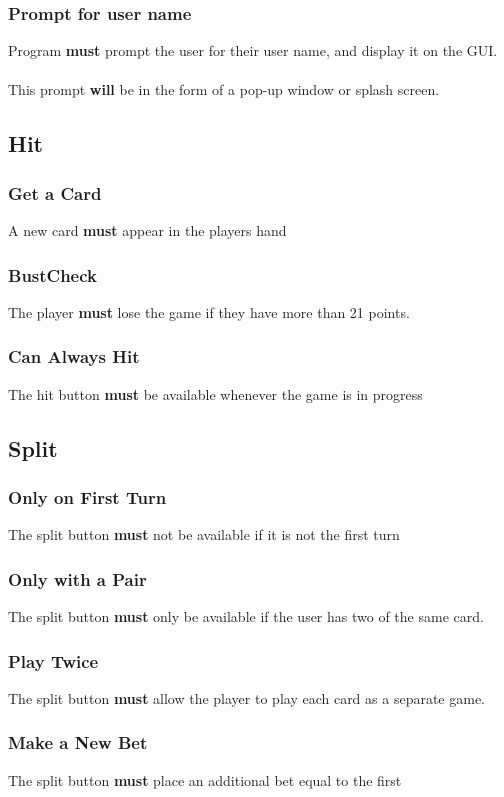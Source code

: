 \documentclass{article}
\begin{document}
\subsubsection{Prompt for user name}Program \textbf{must} prompt the user for their user name, and display it on the GUI.  
\paragraph{}This prompt \textbf{will} be in the form of a pop-up window or splash screen.
\subsection{Hit}
\subsubsection{Get a Card}A new card \textbf{must} appear in the players hand
\subsubsection{BustCheck} The player \textbf{must} lose the game if they have more than 21 points.
\subsubsection{Can Always Hit}The hit button \textbf{must} be available whenever the game is in progress
\subsection{Split }
\subsubsection{Only on First Turn}The split button \textbf{must} not be available if it is not the first turn
\subsubsection{Only with a Pair}The split button \textbf{must} only be available if the user has two of the same card.
\subsubsection{Play Twice}The split button \textbf{must} allow the player to play each card as a separate game.
\subsubsection{Make a New Bet}The split button \textbf{must} place an additional bet equal to the first
\end{document}
